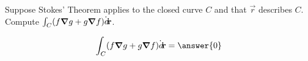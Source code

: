 \documentclass{ximera}
\author{David Guichard \and Neal Koblitz \and H. Jerome Keisler \and Albert Scheller \and Barry Balof \and Mike Wills \and Matthew Carr}
\begin{document}
\begin{exercise}




Suppose Stokes' Theorem applies to the closed curve $C$ and that $\vec{r}$ describes $C$. Compute $\int_{C}(f\boldsymbol\nabla g+g\boldsymbol\nabla f)\dot{\mathop{}\!d\!}\mathbf{r}$.

\begin{prompt}
\[
\int_{C}(f\grad g+g\grad f)\dot\d\vec{r}=\answer{0}
\]
\end{prompt}


\end{exercise}
\end{document}
